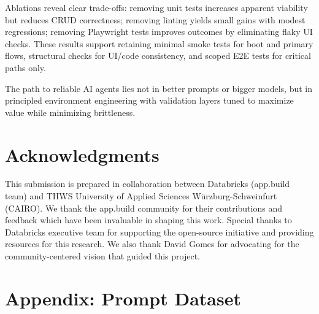 \documentclass[conference]{IEEEtran}
\begin{document}
Ablations reveal clear trade-offs: removing unit tests increases apparent viability but reduces CRUD correctness; removing linting yields small gains with modest regressions; removing Playwright tests improves outcomes by eliminating flaky UI checks. These results support retaining minimal smoke tests for boot and primary flows, structural checks for UI/code consistency, and scoped E2E tests for critical paths only.

The path to reliable AI agents lies not in better prompts or bigger models, but in principled environment engineering with validation layers tuned to maximize value while minimizing brittleness.

\section*{Acknowledgments}

This submission is prepared in collaboration between Databricks (app.build team) and THWS University of Applied Sciences Würzburg-Schweinfurt (CAIRO). We thank the app.build community for their contributions and feedback which have been invaluable in shaping this work. Special thanks to Databricks executive team for supporting the open-source initiative and providing resources for this research. We also thank David Gomes for advocating for the community-centered vision that guided this project.





\section*{Appendix: Prompt Dataset}
\label{sec:prompt-dataset}
\end{document}
